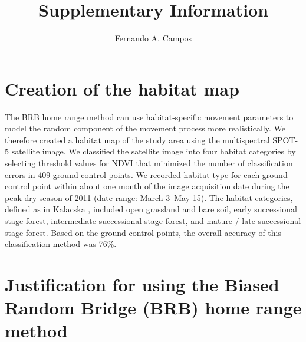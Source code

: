 \documentclass{article}\usepackage[]{graphicx}\usepackage[]{color}
\begin{document}
\doublespacing




\title{Supplementary Information}


\author{Fernando A. Campos}
\maketitle

\section*{Creation of the habitat map}

The BRB home range method \parencite{Benhamou2011} can use habitat-specific movement parameters to model the random component of the movement process more realistically. We therefore created a habitat map of the study area using the multispectral SPOT-5 satellite image. We classified the satellite image into four habitat categories by selecting threshold values for NDVI that minimized the number of classification errors in 409 ground control points. We recorded habitat type for each ground control point within about one month of the image acquisition date during the peak dry season of 2011 (date range: March 3--May 15). The habitat categories, defined as in Kalacska \parencite*{Kalacska2004}, included open grassland and bare soil, early successional stage forest, intermediate successional stage forest, and mature / late successional stage forest. Based on the ground control points, the overall accuracy of this classification method was 76\%.

\section*{Justification for using the Biased Random Bridge (BRB) home range method}
\end{document}

